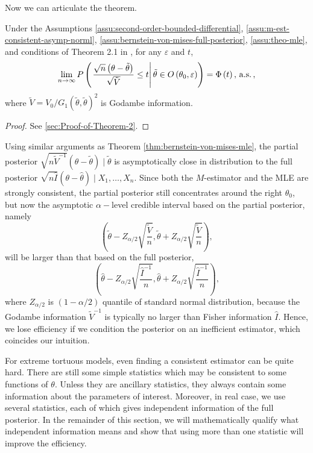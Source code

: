 Now we can articulate the theorem. 
\begin{thm}
\label{thm:partial-post-m-est}Under the Assumptions \ref{assu:second-order-bounded-differential},
\ref{assu:m-est-consistent-asymp-norml}, \ref{assu:bernstein-von-mises-full-posterior},
\ref{assu:theo-mle}, and conditions of Theorem 2.1 in \citet{rivoirard2012bernstein},
for any $\varepsilon$ and $t$, 
\[
\lim_{n\rightarrow\infty}P\left(\left.\frac{\sqrt{n}\left(\theta-\tilde{\theta}\right)}{\sqrt{\tilde{V}}}\le t\right|\tilde{\theta}\in O\left(\theta_{0},\varepsilon\right)\right)=\Phi\left(t\right),\,\mathrm{a.s.}\,,
\]
where $\tilde{V}=V_{0}/G_{1}\left(\tilde{\theta},\tilde{\theta}\right)^{2}$
is Godambe information. \end{thm}
\begin{proof}
See  \ref{sec:Proof-of-Theorem-2}.
\end{proof}
Using similar arguments as Theorem \ref{thm:bernstein-von-mises-mle},
the partial posterior $\sqrt{n\tilde{V}^{-1}}\left(\theta-\tilde{\theta}\right)\mid\tilde{\theta}$ {{}
} {is asymptotically } close in distribution to  {the
}full posterior $\sqrt{n\hat{I}}\left(\theta-\hat{\theta}\right)\mid X_{1},\ldots,X_{n}$.
Since both the $M$-estimator and the MLE are strongly consistent,
the partial posterior still concentrates around the right $\theta_{0}$,
but now the asymptotic $\alpha-$level credible interval based on
the partial posterior, namely 
\[
\left(\tilde{\theta}-Z_{\alpha/2}\sqrt{\frac{\tilde{V}}{n}},\tilde{\theta}+Z_{\alpha/2}\sqrt{\frac{\tilde{V}}{n}}\right),
\]
will be larger than that based on the full posterior, 
\[
\left(\hat{\theta}-Z_{\alpha/2}\sqrt{\frac{\hat{I}^{-1}}{n}},\hat{\theta}+Z_{\alpha/2}\sqrt{\frac{\hat{I}^{-1}}{n}}\right),
\]
where $Z_{\alpha/2}$ is $\left(1-\alpha/2\right)$ quantile of standard
normal distribution, because the Godambe information $\tilde{V}^{-1}$
is typically no larger than Fisher information $\hat{I}$. Hence,
we lose efficiency if we condition the posterior on an inefficient
estimator, which coincides our intuition.

For extreme tortuous models, even finding a consistent estimator can
be quite hard. There are still some simple statistics which may be
consistent to some {{} } {functions } of
$\theta$. Unless they are ancillary statistics, they always contain
some information about the {{} } {parameters
} of interest. Moreover, in real case, we use several statistics,
each of which gives independent information of the full posterior.
In the remainder of this section, we will mathematically qualify what
independent information means and show that using more than one statistic
will improve the efficiency. 


